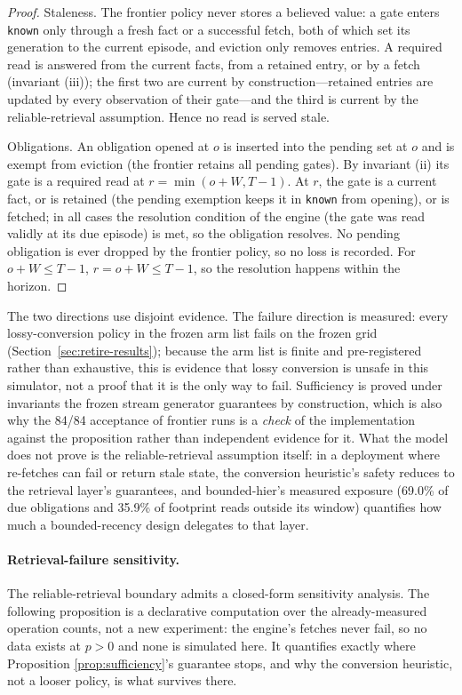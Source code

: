 \begin{proof}
Staleness. The frontier policy never stores a believed value: a gate
enters \texttt{known} only through a fresh fact or a successful fetch,
both of which set its generation to the current episode, and eviction
only removes entries. A required read is answered from the current
facts, from a retained entry, or by a fetch (invariant (iii)); the
first two are current by construction---retained entries are updated
by every observation of their gate---and the third is current by the
reliable-retrieval assumption. Hence no read is served stale.

Obligations. An obligation opened at $o$ is inserted into the pending
set at $o$ and is exempt from eviction (the frontier retains all
pending gates). By invariant (ii) its gate is a required read at
$r=\min(o+W,T-1)$. At $r$, the gate is a current fact, or is retained
(the pending exemption keeps it in \texttt{known} from opening), or is
fetched; in all cases the resolution condition of the engine (the gate
was read validly at its due episode) is met, so the obligation
resolves. No pending obligation is ever dropped by the frontier
policy, so no loss is recorded. For $o+W\le T-1$, $r=o+W\le T-1$, so
the resolution happens within the horizon.
\end{proof}

\begin{remark}
The two directions use disjoint evidence. The failure direction is
measured: every lossy-conversion policy in the frozen arm list fails
on the frozen grid
(Section~\ref{sec:retire-results}); because the arm list is finite
and pre-registered rather than exhaustive, this is evidence that
lossy conversion is unsafe in this simulator, not a proof that it is
the only way to fail. Sufficiency is proved under invariants the
frozen stream generator guarantees by construction, which is also why
the 84/84 acceptance of frontier runs is a \emph{check} of the
implementation against the proposition rather than independent
evidence for it. What the model does not prove is the
reliable-retrieval assumption itself: in a deployment where re-fetches
can fail or return stale state, the conversion heuristic's safety reduces
to the retrieval layer's guarantees, and bounded-hier's measured
exposure (69.0\% of due obligations and 35.9\% of footprint reads
outside its window) quantifies how much a bounded-recency design
delegates to that layer.
\end{remark}

\paragraph{Retrieval-failure sensitivity.}
The reliable-retrieval boundary admits a closed-form sensitivity
analysis. The following proposition is a declarative computation over
the already-measured operation counts, not a new experiment: the
engine's fetches never fail, so no data exists at $p>0$ and none is
simulated here. It quantifies exactly where Proposition
\ref{prop:sufficiency}'s guarantee stops, and why the conversion heuristic,
not a looser policy, is what survives there.

